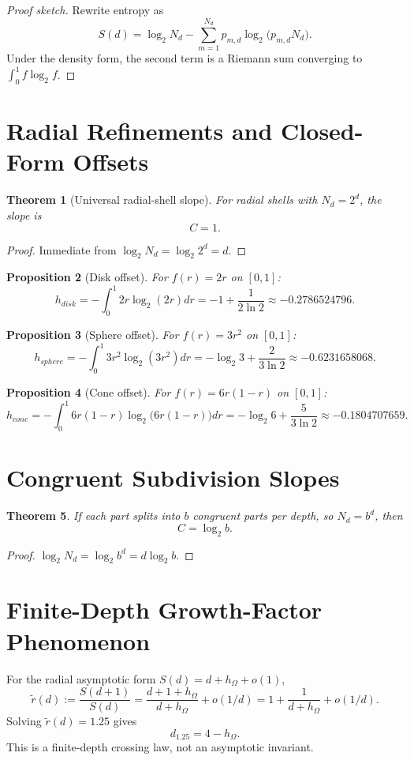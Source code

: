 \documentclass[11pt,a4paper]{article}
\newtheorem{theorem}{Theorem}[section]
\newtheorem{proposition}[theorem]{Proposition}
\begin{document}
\begin{proof}[Proof sketch]
Rewrite entropy as
\[
S(d)=\log_2 N_d - \sum_{m=1}^{N_d} p_{m,d}\log_2\big(p_{m,d}N_d\big).
\]
Under the density form, the second term is a Riemann sum converging to
$\int_0^1 f\log_2 f$.
\end{proof}

\section{Radial Refinements and Closed-Form Offsets}
\begin{theorem}[Universal radial-shell slope]
For radial shells with $N_d=2^d$, the slope is
\[
C=1.
\]
\end{theorem}

\begin{proof}
Immediate from $\log_2 N_d=\log_2 2^d=d$.
\end{proof}

\begin{proposition}[Disk offset]
For $f(r)=2r$ on $[0,1]$:
\[
h_{disk}=-\int_0^1 2r\log_2(2r)dr=-1+\frac{1}{2\ln2}\approx -0.2786524796.
\]
\end{proposition}

\begin{proposition}[Sphere offset]
For $f(r)=3r^2$ on $[0,1]$:
\[
h_{sphere}=-\int_0^1 3r^2\log_2(3r^2)dr=-\log_2 3+\frac{2}{3\ln2}\approx -0.6231658068.
\]
\end{proposition}

\begin{proposition}[Cone offset]
For $f(r)=6r(1-r)$ on $[0,1]$:
\[
h_{cone}=-\int_0^1 6r(1-r)\log_2\!\big(6r(1-r)\big)dr
=-\log_2 6+\frac{5}{3\ln2}\approx -0.1804707659.
\]
\end{proposition}

\section{Congruent Subdivision Slopes}
\begin{theorem}
If each part splits into $b$ congruent parts per depth, so $N_d=b^d$, then
\[
C=\log_2 b.
\]
\end{theorem}

\begin{proof}
$\log_2 N_d = \log_2 b^d = d\log_2 b$.
\end{proof}

\section{Finite-Depth Growth-Factor Phenomenon}
For the radial asymptotic form $S(d)=d+h_\Omega+o(1)$,
\[
\tilde r(d):=\frac{S(d+1)}{S(d)}=\frac{d+1+h_\Omega}{d+h_\Omega}+o(1/d)
=1+\frac{1}{d+h_\Omega}+o(1/d).
\]
Solving $\tilde r(d)=1.25$ gives
\[
d_{1.25}=4-h_\Omega.
\]
This is a finite-depth crossing law, not an asymptotic invariant.
\end{document}
